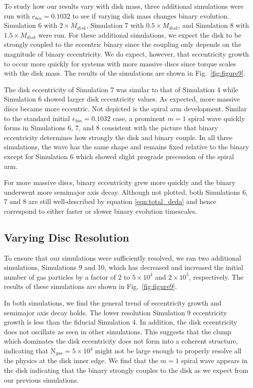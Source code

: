 To study how our results vary with disk mass, three additional simulations were run with $e_{bin} =
0.1032$ to see if varying disk mass changes binary evolution.  Simulation 6
with $2 \times M_{disk}$, Simulation 7 with $0.5 \times M_{disk}$, and
Simulation 8 with $1.5 \times M_{disk}$ were run.  For these additional simulations, we expect the disk to be strongly coupled to the eccentric binary since the 
coupling only depends on the magnitude of binary eccentricity.  We do expect, however, that eccentricity growth to occur more quickly for systems with more 
massive discs since torque scales with the disk mass.  The results of the simulations are shown in Fig.~\ref{fig:figure9}.

The disk eccentricity of Simulation 7 was similar to that of Simulation 4 while Simulation 6 showed larger disk eccentricity values.  As expected, more massive 
discs became more eccentric.  Not depicted is the spiral arm development.  Similar to the standard initial $e_{bin} = 0.1032$ case, a prominent $m = 1$ spiral 
wave quickly forms in Simulations 6, 7, and 8 consistent with the picture that binary eccentricity determines how strongly the disk and binary couple.  In all three 
simulations, the wave has the same shape and remains fixed relative to the binary except for Simulation 6 which showed slight prograde precession of the 
spiral arm.  

For more massive discs, binary eccentricity grew more quickly and the binary underwent more semimajor axis decay.  Although not plotted, both Simulations 6, 7 and 8 are still well-described by equation \ref{eqn:total_deda} and hence correspond to
either faster or slower binary evolution timescales.  


\subsection{Varying Disc Resolution} \label{VaryingDiscResolution}

To ensure that our simulations were sufficiently resolved, we ran two additional simulations, Simulations 9 and 10, which has decreased and increased
 the initial number of gas particles by a factor of 2 to $5 \times 10^4$ and $2 \times 10^5$, respectively.  The results of these simulations are shown in Fig.~\ref{fig:figure9}.
 
 In both simulations, we find the general trend of eccentricity growth and semimajor axis decay holds.  The lower resolution Simulation 9 eccentricity 
 growth is less than the fiducial Simulation 4.  In addition, the disk eccentricity does not oscillate as seen in other simulations.  This suggests that the clump 
 which dominates the disk eccentricity does not form into a coherent structure, indicating that N$_{gas} = 5 \times 
 10^4$ might not be large enough to properly resolve all the physics at the disk inner edge.  We find that the $m = 1$ spiral wave appears in the disk indicating 
 that the binary strongly couples to the disk as we expect from our previous simulations.
 
